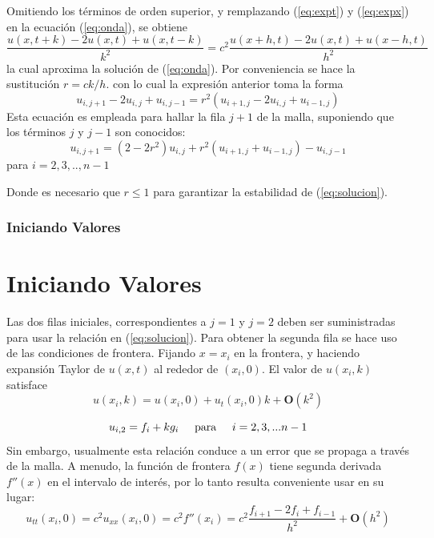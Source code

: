 \documentclass{beamer}
\begin{document}

\begin{frame}
Omitiendo los términos de orden superior, y remplazando (\ref{eq:expt}) y (\ref{eq:expx}) en la ecuación (\ref{eq:onda}), se obtiene
\begin{equation*}
     \frac{u(x,t+k)-2u(x,t)+u(x,t-k)}{k^2}=c^2\frac{u(x+h,t)-2u(x,t)+u(x-h,t)}{h^2}
\end{equation*}
la cual aproxima la solución de (\ref{eq:onda}). Por conveniencia se hace la sustitución $r=ck/h$. con lo cual la expresión anterior toma la forma
\begin{equation*}
    u_{i,j+1}-2u_{i,j}+u_{i,j-1}=r^2(u_{i+1,j}-2u_{i,j}+u_{i-1,j})
\end{equation*}
Esta ecuación es empleada para hallar la fila $j+1$ de la malla, suponiendo que los términos $j$ y $j-1$ son conocidos:
\begin{equation}\label{eq:solucion}
    u_{i,j+1}=(2-2r^2)u_{i,j}+r^2(u_{i+1,j}+u_{i-1,j})-u_{i,j-1}
\end{equation}
para $i=2,3,..,n-1$

Donde es necesario que $r\leq 1$ para garantizar la estabilidad de (\ref{eq:solucion}).
\end{frame}


\begin{frame}
\frametitle{Iniciando Valores}
\section{Iniciando Valores}
Las dos filas iniciales, correspondientes a $j=1$ y $j=2$ deben ser suministradas para usar la relación en (\ref{eq:solucion}). Para obtener la segunda fila se hace uso de las condiciones de frontera. Fijando $x=x_i$ en la frontera, y haciendo expansión Taylor de $u(x,t)$ al rededor de $(x_i,0)$. El valor de $u(x_i,k)$ satisface
\begin{equation*}
    u(x_i,k)=u(x_i,0)+u_t(x_i,0)k+\textbf{O}(k^2)
\end{equation*}

\begin{equation*}
    u_{i,2}=f_i+kg_i \hspace{0.5cm}\text{para}\hspace{0.5cm}i=2,3,...n-1
\end{equation*}
Sin embargo, usualmente esta relación conduce a un error que se propaga a través de la malla. 
A menudo, la función de frontera $f(x)$ tiene segunda derivada $f''(x)$ en el intervalo de interés, por lo tanto resulta conveniente usar en su lugar:
\begin{equation*}
    u_{tt}(x_i,0)=c^2u_{xx}(x_i,0)=c^2f''(x_i)=c^2\frac{f_{i+1}-2f_i+f_{i-1}}{h^2}+\textbf{O}(h^2)
\end{equation*}

\end{frame}
\end{document}
